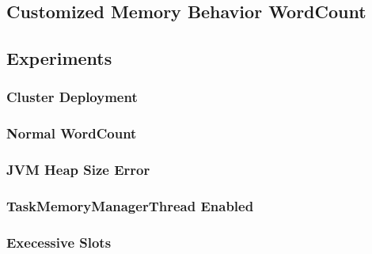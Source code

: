 \subsection{Customized Memory Behavior WordCount}


\subsection{Experiments}

\subsubsection{Cluster Deployment}


\subsubsection{Normal WordCount}


\subsubsection{JVM Heap Size Error}


\subsubsection{TaskMemoryManagerThread Enabled}


\subsubsection{Execessive Slots}
